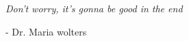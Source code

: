 
\clearpage
\vspace*{\fill}
\begin{center}
\begin{minipage}{.6\textwidth}
  \textit{Don't worry, it's gonna be good in the end}

  - Dr. Maria wolters
\end{minipage}
\end{center}
\vfill %
\clearpage
